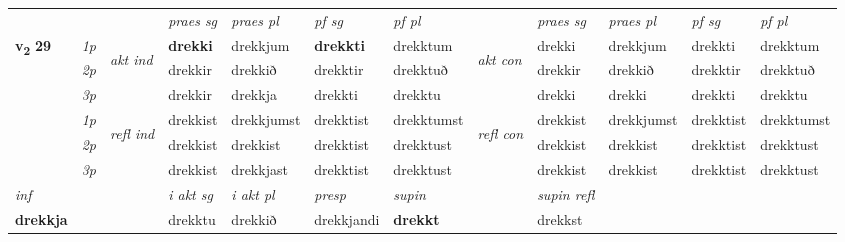 \begin{longtable}[l]{X>{\footnotesize\itshape}llXXXXlXXXX}
 & &   & \textit{praes sg}  & \textit{praes pl}    & \textit{ pf sg} & \textit{pf pl} & & \textit{praes sg}  & \textit{praes pl}    & \textit{pf sg} & \textit{pf pl }  \\ \cmidrule{4-7} \cmidrule{9-12}
 \multirow{2}{*}{{{\textbf{v{\textsubscript{2}}} \Large{\textbf{29}}}}}  & 1p & \multirow{3}{*}{\begin{turn}{90}\textit{akt ind}\end{turn}} & \textbf{drekki} & drekkjum & \textbf{drekkti} & drekktum & \multirow{3}{*}{\begin{turn}{90}\textit{akt con}\end{turn}} &drekki & drekkjum & drekkti & drekktum\\*
 & 2p &  &  drekkir  & drekkið & drekktir & drekktuð & & drekkir & drekkið & drekktir & drekktuð \\*
 & 3p &  & drekkir & drekkja & drekkti & drekktu & & drekki & drekki& drekkti & drekktu \\*
\cmidrule{4-7} \cmidrule{9-12}
 & 1p & \multirow{3}{*}{\begin{turn}{90}\textit{refl ind}\end{turn}}  & drekkist & drekkjumst & drekktist & drekktumst & \multirow{3}{*}{\begin{turn}{90}\textit{refl con}\end{turn}}  &drekkist & drekkjumst & drekktist & drekktumst \\*
 & 2p &  & drekkist & drekkist & drekktist & drekktust & &drekkist & drekkist & drekktist & drekktust \\*
 & 3p  & & drekkist & drekkjast & drekktist & drekktust & & drekkist & drekkist& drekktist & drekktust \\*
\cmidrule{4-7} \cmidrule{9-12}

   {\textit{inf}} & &  & \textit{i akt sg} & \textit{i akt pl}   & \textit{presp} & \textit{supin} && \textit{supin refl}  \\*
  {\textbf{drekkja}} & && drekktu  & drekkið   & drekkjandi &  \textbf{drekkt} && drekkst  \\*

\midrule


\end{longtable}

